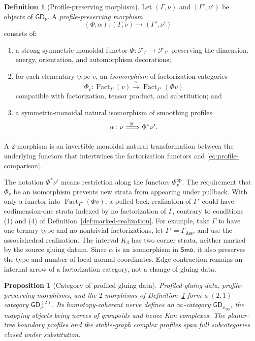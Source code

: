 \documentclass[11pt,letterpaper,twoside]{article}
\theoremstyle{plain}
\newtheorem{proposition}[theorem]{Proposition}
\theoremstyle{definition}
\newtheorem{definition}[theorem]{Definition}
\theoremstyle{remark}
\newcommand{\LGrm}{\mathsf{GD}_{\nu}}
\newcommand{\Smo}{\mathsf{Smo}}
\DeclareMathOperator{\Fact}{Fact}
\begin{document}
\begin{definition}[Profile-preserving morphism]\label{def:profile-morphism}
Let \((\Gamma,\nu)\) and \((\Gamma',\nu')\) be objects of \(\LGrm\).  A \emph{profile-preserving morphism}
\[
 (\Phi,\alpha):(\Gamma,\nu)\longrightarrow(\Gamma',\nu')
\]
consists of:
\begin{enumerate}
\item a strong symmetric monoidal functor
\(\Phi:\mathcal F_\Gamma\to\mathcal F_{\Gamma'}\) preserving the dimension, energy, orientation, and automorphism decorations;
\item for each elementary type \(v\), an \emph{isomorphism} of factorization categories
\[
 \Phi_v:\Fact_\Gamma(v)
 \xrightarrow{\ \cong\ }\Fact_{\Gamma'}(\Phi v)
\]
compatible with factorization, tensor product, and substitution; and
\item a symmetric-monoidal natural isomorphism of smoothing profiles
\begin{equation}\label{eq:profile-comparison}
 \alpha:\nu\xRightarrow{\ \cong\ }\Phi^*\nu'.
\end{equation}
\end{enumerate}
A \(2\)-morphism is an invertible monoidal natural transformation between the underlying functors that intertwines the factorization functors and \eqref{eq:profile-comparison}.
\end{definition}

The notation \(\Phi^*\nu'\) means restriction along the functors \(\Phi_v^{\mathrm{op}}\).  The requirement that \(\Phi_v\) be an isomorphism prevents new strata from appearing under pullback.  With only a functor into \(\Fact_{\Gamma'}(\Phi v)\), a pulled-back realization of \(\Gamma'\) could have codimension-one strata indexed by no factorization of \(\Gamma\), contrary to conditions (1) and (4) of Definition~\ref{def:marked-realization}.  For example, take \(\Gamma\) to have one ternary type and no nontrivial factorizations, let \(\Gamma'=\Gamma_{\mathrm{Ass}}\), and use the associahedral realization.  The interval \(K_3\) has two corner strata, neither marked by the source gluing datum.  Since \(\alpha\) is an isomorphism in \(\Smo\), it also preserves the type and number of local normal coordinates.  Edge contraction remains an internal arrow of a factorization category, not a change of gluing data.

\begin{proposition}[Category of profiled gluing data]\label{prop:profile-category}
Profiled gluing data, profile-preserving morphisms, and the \(2\)-morphisms of Definition~\ref{def:profile-morphism} form a \((2,1)\)-category \(\LGrm^{(2)}\).  Its homotopy-coherent nerve defines an \(\infty\)-category \({\LGrm}_\infty\), the mapping objects being nerves of groupoids and hence Kan complexes.  The planar-tree boundary profiles and the stable-graph complex profiles span full subcategories closed under substitution.
\end{proposition}
\end{document}
